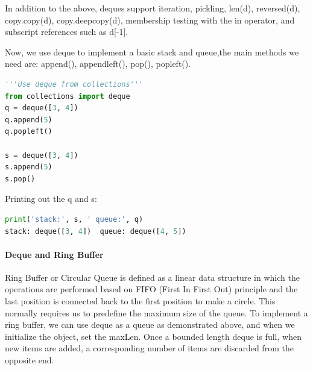 \documentclass[../main.tex]{subfiles}
\begin{document}
In addition to the above, deques support iteration, pickling, len(d), reversed(d), copy.copy(d), copy.deepcopy(d), membership testing with the in operator, and subscript references such as d[-1]. %

Now, we use deque to implement a basic stack and queue,the main methods we need are: append(), appendleft(), pop(), popleft().
\begin{lstlisting}[language = Python]
'''Use deque from collections'''
from collections import deque
q = deque([3, 4])
q.append(5)
q.popleft()

s = deque([3, 4])
s.append(5)
s.pop()
\end{lstlisting}
Printing out the q and s:
\begin{lstlisting}[language=Python]
print('stack:', s, ' queue:', q)
stack: deque([3, 4])  queue: deque([4, 5])
\end{lstlisting}

\paragraph{Deque and Ring Buffer} Ring Buffer or Circular Queue is defined as a linear data structure in which the operations are performed based on FIFO (First In First Out) principle and the last position is connected back to the first position to make a circle. This normally requires us to predefine the maximum size of the queue. To implement a ring buffer, we can use deque as a queue as demonstrated above, and when we initialize the object, set the maxLen.  Once a bounded length deque is full, when new items are added, a corresponding number of items are discarded from the opposite end. 
\end{document}
